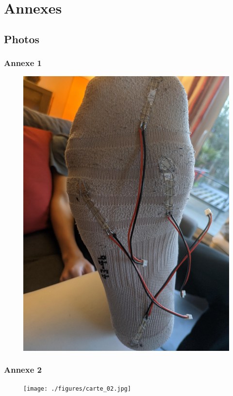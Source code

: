 \section{Annexes}
\subsection{Photos}
\begin{frame}
    \frametitle{Annexe 1}
    \begin{figure}
        \includegraphics[scale=0.05]{./figures/chau_02.jpg}
    \end{figure}
\end{frame}
\begin{frame}
    \frametitle{Annexe 2}
    \begin{figure}
        \texttt{[image: ./figures/carte\_02.jpg]}
    \end{figure}
\end{frame}
